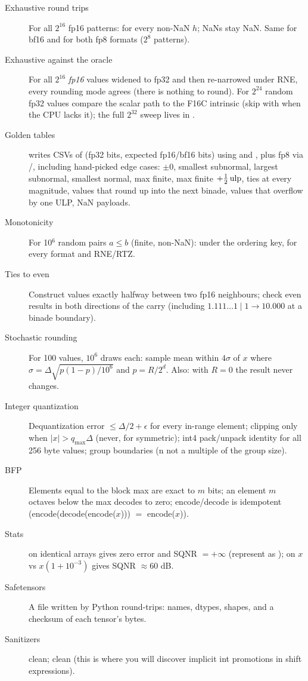 \begin{description}
  \item[Exhaustive round trips] For all $2^{16}$ fp16 patterns:  for every non-NaN $h$; NaNs stay NaN. Same for bf16 and for both fp8 formats ($2^8$ patterns).
  \item[Exhaustive against the oracle] For all $2^{16}$ \emph{fp16} values widened to fp32 and then re-narrowed under RNE, every rounding mode agrees (there is nothing to round). For $2^{24}$ random fp32 values compare the scalar path to the F16C intrinsic (skip with  when the CPU lacks it); the full $2^{32}$ sweep lives in .
  \item[Golden tables]  writes CSVs of (fp32 bits, expected fp16/bf16 bits) using  and , plus fp8 via /, including hand-picked edge cases: $\pm0$, smallest subnormal, largest subnormal, smallest normal, max finite, max finite $+\frac12\operatorname{ulp}$, ties at every magnitude, values that round up into the next binade, values that overflow by one ULP, NaN payloads.
  \item[Monotonicity] For 10$^6$ random pairs $a\le b$ (finite, non-NaN):  under the ordering key, for every format and RNE/RTZ.
  \item[Ties to even] Construct values exactly halfway between two fp16 neighbours; check even results in both directions of the carry (including $1.111\ldots1\!\mid\!1 \to 10.000$ at a binade boundary).
  \item[Stochastic rounding] For 100 values, $10^6$ draws each: sample mean within $4\sigma$ of $x$ where $\sigma = \Delta\sqrt{p(1-p)/10^6}$ and $p = R/2^d$. Also: with $R=0$ the result never changes.
  \item[Integer quantization] Dequantization error $\le \Delta/2 + \epsilon$ for every in-range element; clipping only when $|x| > q_{\max}\Delta$ (never, for symmetric); int4 pack/unpack identity for all 256 byte values; group boundaries (n not a multiple of the group size).
  \item[BFP] Elements equal to the block max are exact to $m$ bits; an element $m$ octaves below the max decodes to zero; encode/decode is idempotent (encode(decode(encode($x$))) $=$ encode($x$)).
  \item[Stats]  on identical arrays gives zero error and SQNR $=+\infty$ (represent as ); on $x$ vs $x(1+10^{-3})$ gives SQNR $\approx 60$ dB.
  \item[Safetensors] A file written by Python round-trips: names, dtypes, shapes, and a checksum of each tensor's bytes.
  \item[Sanitizers]  clean;  clean (this is where you will discover implicit int promotions in shift expressions).
\end{description}

